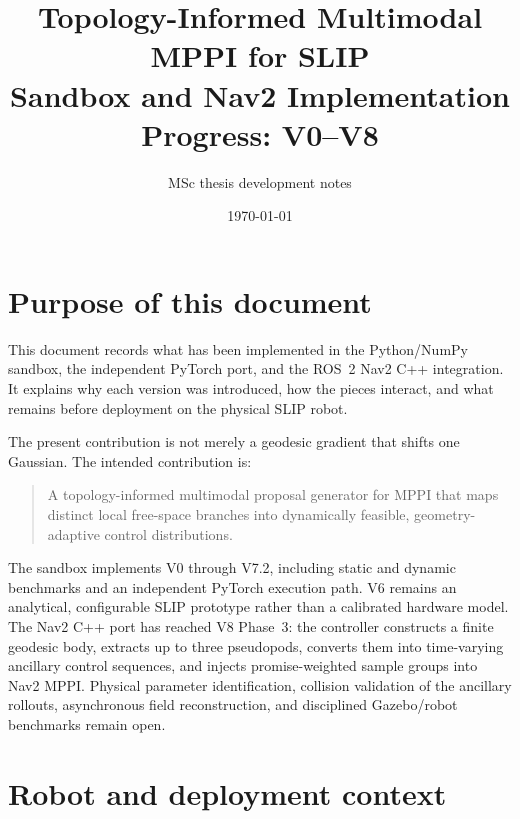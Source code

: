 \documentclass[11pt,a4paper]{article}
\title{Topology-Informed Multimodal MPPI for SLIP\\
\large Sandbox and Nav2 Implementation Progress: V0--V8}
\author{MSc thesis development notes}
\date{\today}
\begin{document}
\maketitle
\tableofcontents
\newpage

\section{Purpose of this document}

This document records what has been implemented in the Python/NumPy sandbox,
the independent PyTorch port, and the ROS~2 Nav2 C++ integration. It explains
why each version was introduced, how the pieces interact, and what remains
before deployment on the physical SLIP robot.

The present contribution is not merely a geodesic gradient that shifts one
Gaussian. The intended contribution is:

\begin{quote}
A topology-informed multimodal proposal generator for MPPI that maps distinct
local free-space branches into dynamically feasible, geometry-adaptive control
distributions.
\end{quote}

The sandbox implements V0 through V7.2, including static and dynamic
benchmarks and an independent PyTorch execution path. V6 remains an
analytical, configurable SLIP prototype rather than a calibrated hardware
model. The Nav2 C++ port has reached V8 Phase~3: the controller constructs a
finite geodesic body, extracts up to three pseudopods, converts them into
time-varying ancillary control sequences, and injects promise-weighted sample
groups into Nav2 MPPI. Physical parameter identification, collision validation
of the ancillary rollouts, asynchronous field reconstruction, and disciplined
Gazebo/robot benchmarks remain open.

\section{Robot and deployment context}
\end{document}
